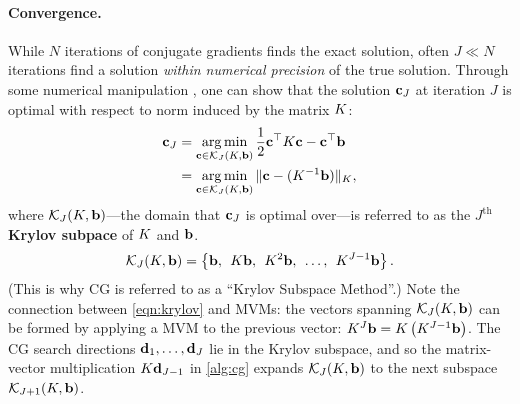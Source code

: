 

\paragraph{Convergence.}
While $N$ iterations of conjugate gradients finds the exact solution, often $J \ll N$ iterations find a solution \emph{within numerical precision} of the true solution.
Through some numerical manipulation \citep[][Ch. 9]{shewchuk1994introduction}, one can show that the solution $\mathbf{c}_J$ at iteration $J$ is optimal with respect to norm induced by the matrix $K$:
%
\begin{align}
  \mathbf{c}_J
  &= \operatorname*{arg\,min}_{\mathbf{c} \in \mathcal{K}_J (K, \mathbf{b})} \frac{1}{2} \mathbf{c}^\top K \mathbf{c} - \mathbf{c}^\top \mathbf{b}
  \nonumber \\
  &= \operatorname*{arg\,min}_{\mathbf{c} \in \mathcal{K}_J (K, \mathbf{b})} \Vert \mathbf{c} - (K^{-1} \mathbf{b}) \Vert_{K},
  \label{eqn:cg_optimality}
\end{align}
%
where $\mathcal{K}_J (K, \mathbf{b})$---the domain that $\mathbf{c}_J$ is optimal over---is referred to as the $J^\text{th}$ {\bf Krylov subpace} of $K$ and $\mathbf{b}$.
%
\begin{equation}
  \mathcal{K}_J (K, \mathbf{b}) = \left\{ \mathbf{b}, \:\: K \mathbf{b}, \:\: K^2 \mathbf{b}, \:\: \ldots, \:\: K^{J-1} \mathbf{b} \right\}.
  \label{eqn:krylov}
\end{equation}
%
(This is why CG is referred to as a ``Krylov Subspace Method''.)
Note the connection between \cref{eqn:krylov} and MVMs:
the vectors spanning $\mathcal{K}_J (K, \mathbf{b})$ can be formed by applying a MVM to the previous vector: $K^J \mathbf{b} = K \left( K^{J-1} \mathbf{b} \right)$.
The CG search directions $\mathbf{d}_1, \ldots, \mathbf{d}_J$ lie in the Krylov subspace, and so the matrix-vector multiplication $K \mathbf{d}_{J-1}$ in \cref{alg:cg} expands $\mathcal{K}_{J}(K, \mathbf{b})$ to the next subspace $\mathcal{K}_{J+1} (K, \mathbf{b})$.

